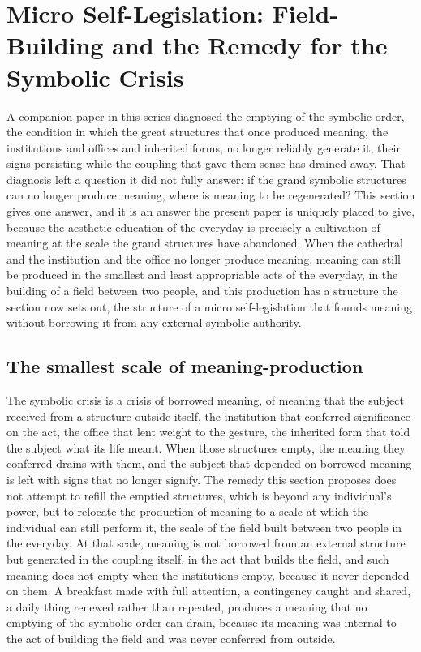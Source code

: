 \section{Micro Self-Legislation: Field-Building and the Remedy for the Symbolic Crisis}
\label{p22:sec:self-legislation}

\noindent
A companion paper in this series diagnosed the emptying of the symbolic order, the condition in which the great structures that once produced meaning, the institutions and offices and inherited forms, no longer reliably generate it, their signs persisting while the coupling that gave them sense has drained away. That diagnosis left a question it did not fully answer: if the grand symbolic structures can no longer produce meaning, where is meaning to be regenerated? This section gives one answer, and it is an answer the present paper is uniquely placed to give, because the aesthetic education of the everyday is precisely a cultivation of meaning at the scale the grand structures have abandoned. When the cathedral and the institution and the office no longer produce meaning, meaning can still be produced in the smallest and least appropriable acts of the everyday, in the building of a field between two people, and this production has a structure the section now sets out, the structure of a micro self-legislation that founds meaning without borrowing it from any external symbolic authority.

\subsection{The smallest scale of meaning-production}
\label{p22:sub:self-leg-smallest}

The symbolic crisis is a crisis of borrowed meaning, of meaning that the subject received from a structure outside itself, the institution that conferred significance on the act, the office that lent weight to the gesture, the inherited form that told the subject what its life meant. When those structures empty, the meaning they conferred drains with them, and the subject that depended on borrowed meaning is left with signs that no longer signify. The remedy this section proposes does not attempt to refill the emptied structures, which is beyond any individual's power, but to relocate the production of meaning to a scale at which the individual can still perform it, the scale of the field built between two people in the everyday. At that scale, meaning is not borrowed from an external structure but generated in the coupling itself, in the act that builds the field, and such meaning does not empty when the institutions empty, because it never depended on them. A breakfast made with full attention, a contingency caught and shared, a daily thing renewed rather than repeated, produces a meaning that no emptying of the symbolic order can drain, because its meaning was internal to the act of building the field and was never conferred from outside.

